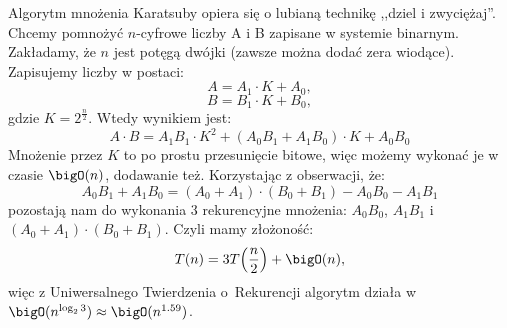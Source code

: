 Algorytm mnożenia Karatsuby opiera się o lubianą technikę ,,dziel i zwyciężaj''.
Chcemy pomnożyć \(n\)-cyfrowe liczby A i B zapisane w systemie binarnym. Zakładamy, że $n$ jest potęgą dwójki (zawsze można dodać zera wiodące). \\
Zapisujemy liczby w postaci:
\[
    A = A_1 \cdot K + A_0,
\]
\[
    B = B_1 \cdot K + B_0,
\]
gdzie \( K = 2^{\frac{n}{2}} \). Wtedy wynikiem jest:
\[
    A \cdot B = A_1 B_1 \cdot K^2 + (A_0 B_1 + A_1 B_0) \cdot K + A_0 B_0
\]
Mnożenie przez \( K \) to po prostu przesunięcie bitowe, więc możemy wykonać je w czasie \( \bigO(n) \), dodawanie też. Korzystając z obserwacji, że:
\[
    A_0 B_1 + A_1 B_0 = (A_0 + A_1) \cdot (B_0 + B_1) - A_0 B_0 - A_1 B_1
\]
pozostają nam do wykonania 3 rekurencyjne mnożenia: \( A_0 B_0 \), \( A_1 B_1 \) i \( (A_0 + A_1) \cdot (B_0 + B_1) \). \linebreak Czyli mamy złożoność:
\[ T(n) = 3T\pars{\frac{n}{2}} + \bigO(n), \]
więc z Uniwersalnego Twierdzenia o~Rekurencji algorytm działa w \( \bigO(n^{\log_2 3}) \approx \bigO(n^{1.59}) \).
